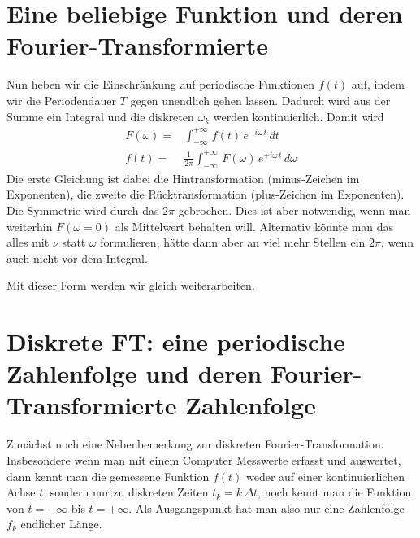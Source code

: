 \section{Eine beliebige Funktion und deren Fourier-Transformierte}

Nun heben wir die Einschränkung auf periodische Funktionen $f(t)$ auf, indem wir die Periodendauer $T$ gegen unendlich gehen lassen. Dadurch wird aus der Summe ein Integral und die diskreten $\omega_k$ werden kontinuierlich. Damit wird
\begin{align}
 F(\omega) = & \int_{-\infty}^{+\infty} \, f(t) \, e^{- i \omega\, t} \, dt \\
 f(t) = & \frac{1}{2 \pi } \int_{-\infty}^{+\infty} \, F(\omega) \, e^{+ i \omega\, t} \, d\omega 
\end{align}
Die erste Gleichung ist dabei die Hintransformation (minus-Zeichen im Exponenten), die zweite die Rücktransformation (plus-Zeichen im Exponenten). Die Symmetrie wird durch das $2 \pi$ gebrochen. Dies ist aber notwendig, wenn man weiterhin $F(\omega = 0)$ als Mittelwert behalten will. Alternativ könnte man das alles mit $\nu$ statt $\omega$  formulieren, hätte dann aber an viel mehr Stellen ein $2 \pi$, wenn auch nicht vor dem Integral.

Mit dieser Form werden wir gleich weiterarbeiten.

\section{Diskrete FT: eine periodische Zahlenfolge und deren Fourier-Transformierte Zahlenfolge}

Zunächst noch eine Nebenbemerkung zur diskreten Fourier-Transformation. Insbesondere wenn man mit einem Computer Messwerte erfasst und auswertet, dann kennt man die gemessene Funktion $f(t)$ weder auf einer kontinuierlichen Achse $t$, sondern nur zu diskreten Zeiten $t_k = k \, \Delta t$, noch kennt man die Funktion von $t = - \infty$ bis $t = + \infty$. Als Ausgangspunkt hat man also nur eine Zahlenfolge $f_k$ endlicher Länge.

